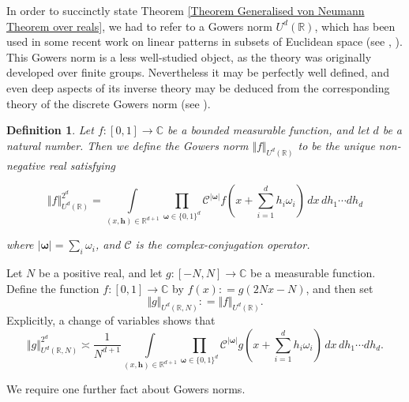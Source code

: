 \documentclass[12pt,a4paper,twoside,reqno]{amsart}
\newtheorem{Definition}[Theorem]{Definition}
\numberwithin{equation}{section}
\begin{document}
In order to succinctly state Theorem \ref{Theorem Generalised von Neumann Theorem over reals}, we had to refer to a Gowers norm $U^d(\mathbb{R})$, which has been used in some recent work on linear patterns in subsets of Euclidean space (see \cite[Lemma 4.2]{CoMa17}, \cite[Proposition 3.3]{DVR17}). This Gowers norm is a less well-studied object, as the theory was originally developed over finite groups. Nevertheless it may be perfectly well defined, and even deep aspects of its inverse theory may be deduced from the corresponding theory of the discrete Gowers norm (see \cite{Ta15}). 
\begin{Definition}
\label{Definition of Gowers norms over R}
Let $f:[0,1]\longrightarrow {\mathbb{C}}$ be a bounded measurable function, and let $d$ be a natural number. Then we define the Gowers norm $\Vert f \Vert_{U^{d}(\mathbb{R})}$ to be the unique non-negative real satisfying 

\begin{equation}
\Vert f \Vert_{U^{d}(\mathbb{R})}^{2^{d}} = \int\limits_{(x,\mathbf{h}) \in\mathbb{R}^{d+1}} \prod\limits_{\boldsymbol{\omega}\in \{0,1\}^d}\mathcal{C}^{\vert \boldsymbol{\omega} \vert} f(x+\sum\limits_{i=1}^d h_i\omega_i) \, dx\,dh_1\cdots dh_d
\end{equation} 

\noindent where $\vert \boldsymbol{\omega}\vert = \sum\limits_i \omega_i$, and $\mathcal{C}$ is the complex-conjugation operator.
\end{Definition}

Let $N$ be a positive real, and let $g:[-N,N]\longrightarrow \mathbb{C}$ be a measurable function. Define the function $f:[0,1]\longrightarrow \mathbb{C}$ by $f(x): = g(2Nx - N)$, and then set $$\Vert g\Vert_{U^d(\mathbb{R},N)}: = \Vert f\Vert_{U^d(\mathbb{R})}.$$ Explicitly, a change of variables shows that \begin{equation}
\label{explicit real gowers norms}
\Vert g \Vert_{U^{d}(\mathbb{R},N)}^{2^{d}} \asymp \frac{1}{N^{d+1}}\int\limits_{(x,\mathbf{h}) \in\mathbb{R}^{d+1}} \prod\limits_{\boldsymbol{\omega}\in \{0,1\}^d}\mathcal{C}^{\vert \boldsymbol{\omega} \vert} g(x+\sum\limits_{i=1}^d h_i\omega_i) \, dx\,dh_1\cdots dh_d.
\end{equation}


We require one further fact about Gowers norms. 
\end{document}
